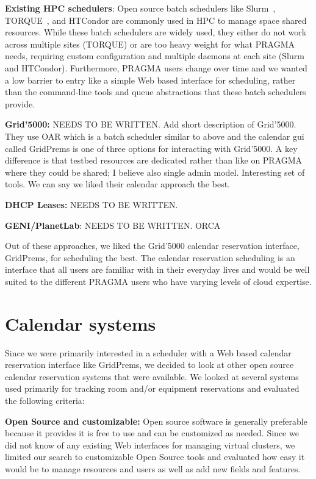 \documentclass{acm_proc_article-sp}
\begin{document}
\textbf{Existing HPC schedulers}:  Open source batch schedulers like Slurm~\cite{slurm}, TORQUE~\cite{torque}, and HTCondor are commonly used in  HPC to manage space shared resources.  While these batch schedulers  are widely used, they either do not work across multiple sites (TORQUE) or are too heavy weight for what PRAGMA needs, requiring custom configuration and multiple daemons at each site (Slurm and HTCondor).  Furthermore, PRAGMA users change over time and we wanted a low barrier to entry like a simple Web based interface for scheduling, rather than the command-line tools and queue abstractions that these batch schedulers provide.

\textbf{Grid'5000:}   NEEDS TO BE WRITTEN.  Add short description of Grid'5000.  They use OAR which is a batch scheduler similar to above and the calendar gui called GridPrems is one of three options for interacting with Grid'5000.  A key difference is that testbed resources are dedicated rather than like on PRAGMA where they could be shared;  I believe also single admin model.  Interesting set of tools.  We can say we liked their calendar approach the best.

\textbf{DHCP Leases:}  NEEDS TO BE WRITTEN.

\textbf{GENI/PlanetLab}:  NEEDS TO BE WRITTEN.  ORCA

Out of these approaches, we liked the Grid'5000 calendar reservation interface, GridPrems, for scheduling the best.  The calendar reservation scheduling is an interface that all users are familiar with in their everyday lives and would be well suited to the different PRAGMA users who have varying levels of cloud expertise.  

\section{Calendar systems}
\label{Sec:Calendars}

Since we were primarily interested in a scheduler with a Web based calendar reservation interface like GridPrems, we decided to look at other open source calendar reservation systems that were available.  We looked at several systems used primarily for tracking room and/or equipment reservations and evaluated the following criteria:

\textbf{Open Source and customizable:}  Open source software is generally preferable because it provides it is free to use and can be customized as needed.  Since we did not know of any existing Web interfaces for managing virtual clusters, we limited our search to customizable Open Source tools and evaluated how easy it would be to manage resources and users as well as add new fields and features. 
\end{document}
